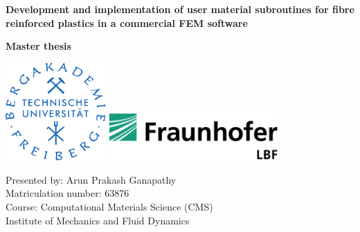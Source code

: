 \begin{titlepage}
	
	\begin{center}
	  	
	  	\vspace*{0.4cm}
	  	
	  	\Large{ \textbf{Development and implementation of user material subroutines for fibre reinforced plastics in a commercial FEM software} }
	  	
	  	\vspace{0.5cm}
	  	
	  	\Large{ \textbf{Master thesis}}
	  	
	  	\vspace{1cm}
	  	
	 \begin{center} \hspace*{0.8cm}	\includegraphics[width=38mm]{logo.png} \hspace*{0.8cm} \vspace{1cm} \centering \includegraphics[width=65mm]{lbf.png} \end{center}
	
	   \vspace{0.5cm}
	   
	 \large { Presented by: Arun Prakash Ganapathy }\\
	  \large { Matriculation number: 63876 } \\
	  \large{Course: Computational Materials Science (CMS)} \\
	    \large{Institute of Mechanics and Fluid Dynamics}\\
	    	\vspace{1.5cm}
	    	
   \begin{tabular}{l l}


\end{tabular}
\end{center}
\end{titlepage}
